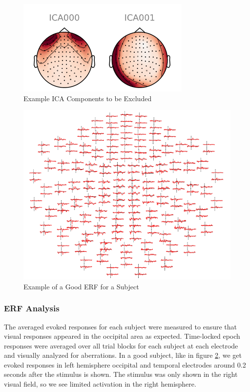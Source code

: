 \documentclass[../main.tex]{subfiles}
\begin{document}
\begin{figure}
    \centering
    \includegraphics{figures/methods/ica_figure.PNG}
    \caption{Example ICA Components to be Excluded}
    \label{ica_exclude}
\end{figure}

\begin{figure}
    \centering
    \includegraphics[scale=0.8]{figures/methods/good_topomap.PNG}
    \caption{Example of a Good ERF for a Subject}
    \label{good_topomap}
\end{figure}

\subsubsection{ERF Analysis}
The averaged evoked responses for each subject were measured to ensure that visual responses
appeared in the occipital area as expected. Time-locked epoch responses were averaged over all
trial blocks for each subject at each electrode and visually analyzed for aberrations. In a good subject, like in figure \ref{good_topomap}, we get evoked responses in left hemisphere occipital and temporal electrodes around 0.2 seconds after the stimulus is shown. The stimulus was only shown in the right visual field, so we see limited activation in the right hemisphere.
\end{document}
